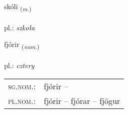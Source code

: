\documentclass[frontgrid, backgrid]{flacards}\usepackage[]{graphicx}\usepackage[]{xcolor}
\begin{document}
\renewcommand{\flhead}{\vskip5pt \fboxsep=0pt {\small\bfseries\footnotesize Nafnorð | Noun}}
\renewcommand{\fcfoot}{\vskip5pt \fboxsep=0pt \hspace{2pt}{\small\bfseries\footnotesize 1K}}

\renewcommand{\blhead}{\vskip5pt {\small\bfseries\footnotesize Nafnorð | Noun }}
\renewcommand{\bcfoot}{\vskip5pt \hspace{2pt}{\small\bfseries\footnotesize 1K}}


{skóli \small{\textsubscript{(\textit{m.})}} \\[1ex] %
\textphonetic{[skouːlɪ]} \\
pl.: \emph{szkoła} \\  [2ex]
\renewcommand*{\arraystretch}{0.8}
}

\renewcommand{\flhead}{\vskip5pt \fboxsep=0pt {\small\bfseries\footnotesize Töluorð | Numeral}}
\renewcommand{\fcfoot}{\vskip5pt \fboxsep=0pt \hspace{2pt}{\small\bfseries\footnotesize 1K}}

\renewcommand{\blhead}{\vskip5pt {\small\bfseries\footnotesize Töluorð | Numeral }}
\renewcommand{\bcfoot}{\vskip5pt \hspace{2pt}{\small\bfseries\footnotesize 1K}}


{fjórir \small{\textsubscript{(\textit{num.})}} \\[1ex] %
\textphonetic{[fjouːrɪr]} \\
pl.: \emph{cztery} \\  [2ex]
\renewcommand*{\arraystretch}{0.8}
\begin{tabular}{ll}
\textsc{sg.nom.}: & fjórir  -- \\ 
\textsc{pl.nom.}: & fjórir -- fjórar -- fjögur
\end{tabular}
}
\end{document}
